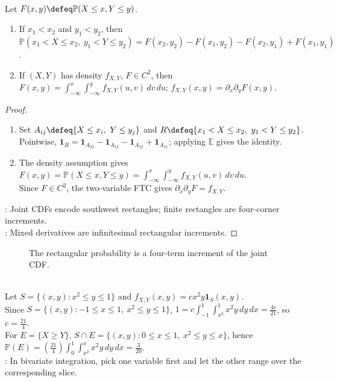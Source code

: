 \begin{proposition} \label{prop:joint-cdf-rectangular-increments-and-density} \\
Let $F(x,y)\defeq\mathbb{P}(X\leq x,Y\leq y)$.
\begin{enumerate}[label=(\roman*)]
\setlength{\itemsep}{0pt}
\item If $x_1<x_2$ and $y_1<y_2$, then $\mathbb{P}(x_1<X\leq x_2,\ y_1<Y\leq y_2)=F(x_2,y_2)-F(x_1,y_2)-F(x_2,y_1)+F(x_1,y_1)$.
\item If $(X,Y)$ has density $f_{X,Y}$, $F\in C^2$, then $F(x,y)=\int_{-\infty}^{x}\int_{-\infty}^{y}f_{X,Y}(u,v)\,dv\,du$; $f_{X,Y}(x,y)=\partial_x\partial_yF(x,y)$.
\end{enumerate}
\begin{proof}
\begin{enumerate}[label=(\roman*)]
\setlength{\itemsep}{0pt}
\item Set $A_{ij}\defeq\{X\leq x_i,\ Y\leq y_j\}$ and $R\defeq\{x_1<X\leq x_2,\ y_1<Y\leq y_2\}$.\\
 Pointwise, $\mathbf{1}_R=\mathbf{1}_{A_{22}}-\mathbf{1}_{A_{12}}-\mathbf{1}_{A_{21}}+\mathbf{1}_{A_{11}}$; applying $\mathbb E$ gives the identity.
\item The density assumption gives $F(x,y)=\mathbb P(X\leq x,Y\leq y)=\int_{-\infty}^{x}\int_{-\infty}^{y}f_{X,Y}(u,v)\,dv\,du$.\\
Since $F\in C^2$, the two-variable FTC gives $\partial_x\partial_yF=f_{X,Y}$.
\end{enumerate}
: Joint CDFs encode southwest rectangles; finite rectangles are four-corner increments.\\
: Mixed derivatives are infinitesimal rectangular increments.
\end{proof}
\end{proposition}

\begin{figure}[H]
  \centering
  
  \caption{The rectangular probability is a four-term increment of the joint CDF.}
  \label{fig:joint-cdf-rectangular-increment}
\end{figure}

\begin{example} \label{ex:bivariate-density-nonrectangular-region} \\
Let $S=\{(x,y):x^2\leq y\leq1\}$ and $f_{X,Y}(x,y)=cx^2y\mathbf{1}_S(x,y)$.\\
Since $S=\{(x,y):-1\leq x\leq1,\ x^2\leq y\leq1\}$, $1=c\int_{-1}^{1}\int_{x^2}^{1}x^2y\,dy\,dx=\frac{4c}{21}$, so $c=\frac{21}{4}$.\\
For $E=\{X\geq Y\}$, $S\cap E=\{(x,y):0\leq x\leq1,\ x^2\leq y\leq x\}$, hence $\mathbb{P}(E)=(\frac{21}{4})\int_0^1\int_{x^2}^{x}x^2y\,dy\,dx=\frac{3}{20}$.\\
: In bivariate integration, pick one variable first and let the other range over the corresponding slice.
\end{example}


